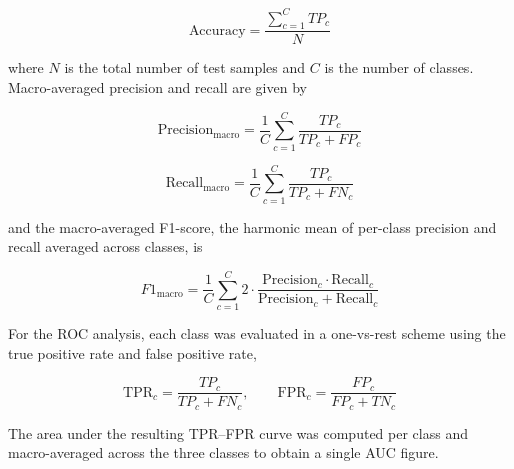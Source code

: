 \documentclass[conference]{IEEEtran}
\begin{document}
\begingroup
\small
\begin{equation}
\label{eq:accuracy}
\text{Accuracy} = \frac{\sum_{c=1}^{C} TP_c}{N}
\end{equation}
\endgroup

where $N$ is the total number of test samples and $C$ is the number of classes. Macro-averaged precision and recall are given by

\begingroup
\small
\begin{equation}
\label{eq:precision}
\text{Precision}_{\text{macro}} = \frac{1}{C}\sum_{c=1}^{C}\frac{TP_c}{TP_c + FP_c}
\end{equation}

\begin{equation}
\label{eq:recall}
\text{Recall}_{\text{macro}} = \frac{1}{C}\sum_{c=1}^{C}\frac{TP_c}{TP_c + FN_c}
\end{equation}
\endgroup

and the macro-averaged F1-score, the harmonic mean of per-class precision and recall averaged across classes, is

\begingroup
\small
\begin{equation}
\label{eq:f1}
F1_{\text{macro}} = \frac{1}{C}\sum_{c=1}^{C} 2\cdot\frac{\text{Precision}_c \cdot \text{Recall}_c}{\text{Precision}_c + \text{Recall}_c}
\end{equation}
\endgroup

For the ROC analysis, each class was evaluated in a one-vs-rest scheme using the true positive rate and false positive rate,

\begingroup
\small
\begin{equation}
\label{eq:roc}
\text{TPR}_c = \frac{TP_c}{TP_c+FN_c}, \qquad \text{FPR}_c = \frac{FP_c}{FP_c+TN_c}
\end{equation}
\endgroup

The area under the resulting TPR--FPR curve was computed per class and macro-averaged across the three classes to obtain a single AUC figure.
\end{document}

